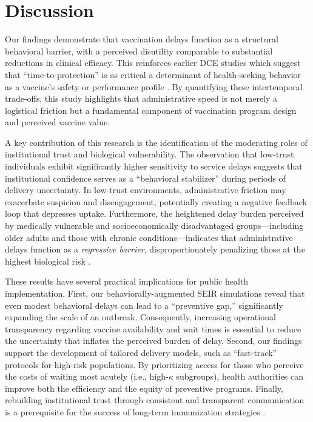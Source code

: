 \section{Discussion}
\label{sec:discussion}

Our findings demonstrate that vaccination delays function as a structural behavioral barrier, with a perceived disutility comparable to substantial reductions in clinical efficacy. This reinforces earlier DCE studies which suggest that ``time-to-protection'' is as critical a determinant of health-seeking behavior as a vaccine's safety or performance profile \citep{Determann2014_PLoS, Chapman2005}. By quantifying these intertemporal trade-offs, this study highlights that administrative speed is not merely a logistical friction but a fundamental component of vaccination program design and perceived vaccine value.

A key contribution of this research is the identification of the moderating roles of institutional trust and biological vulnerability. The observation that low-trust individuals exhibit significantly higher sensitivity to service delays suggests that institutional confidence serves as a ``behavioral stabilizer'' during periods of delivery uncertainty. In low-trust environments, administrative friction may exacerbate suspicion and disengagement, potentially creating a negative feedback loop that depresses uptake. Furthermore, the heightened delay burden perceived by medically vulnerable and socioeconomically disadvantaged groups---including older adults and those with chronic conditions---indicates that administrative delays function as a \textit{regressive barrier}, disproportionately penalizing those at the highest biological risk \citep{Shankar2024}.

These results have several practical implications for public health implementation. First, our behaviorally-augmented SEIR simulations reveal that even modest behavioral delays can lead to a ``preventive gap,'' significantly expanding the scale of an outbreak. Consequently, increasing operational transparency regarding vaccine availability and wait times is essential to reduce the uncertainty that inflates the perceived burden of delay. Second, our findings support the development of tailored delivery models, such as ``fast-track'' protocols for high-risk populations. By prioritizing access for those who perceive the costs of waiting most acutely (i.e., high-$\kappa$ subgroups), health authorities can improve both the efficiency and the equity of preventive programs. Finally, rebuilding institutional trust through consistent and transparent communication is a prerequisite for the success of long-term immunization strategies \citep{Determann2013_EuroSurveill}.

